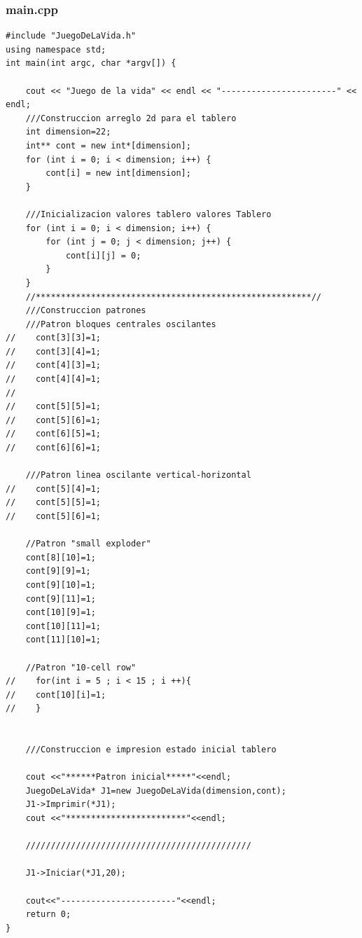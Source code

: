 \documentclass[12pt,letterpaper]{article}
\begin{document}
\subsubsection{main.cpp}
\lstset {language=C}
\begin{lstlisting}
#include "JuegoDeLaVida.h"
using namespace std;
int main(int argc, char *argv[]) {
    
    cout << "Juego de la vida" << endl << "-----------------------" << endl;
    ///Construccion arreglo 2d para el tablero
    int dimension=22;
    int** cont = new int*[dimension];
    for (int i = 0; i < dimension; i++) {
        cont[i] = new int[dimension];
    }
    
    ///Inicializacion valores tablero valores Tablero
    for (int i = 0; i < dimension; i++) {
        for (int j = 0; j < dimension; j++) {
            cont[i][j] = 0;
        }
    }
    //*******************************************************//
    ///Construccion patrones
    ///Patron bloques centrales oscilantes
//    cont[3][3]=1;
//    cont[3][4]=1;
//    cont[4][3]=1;
//    cont[4][4]=1;
//    
//    cont[5][5]=1;
//    cont[5][6]=1;
//    cont[6][5]=1;
//    cont[6][6]=1;
    
    ///Patron linea oscilante vertical-horizontal
//    cont[5][4]=1;
//    cont[5][5]=1;
//    cont[5][6]=1;
    
    //Patron "small exploder"
    cont[8][10]=1;
    cont[9][9]=1;
    cont[9][10]=1;
    cont[9][11]=1;
    cont[10][9]=1;
    cont[10][11]=1;
    cont[11][10]=1;
    
    //Patron "10-cell row"
//    for(int i = 5 ; i < 15 ; i ++){
//    cont[10][i]=1;
//    }
    
    
    ///Construccion e impresion estado inicial tablero
    
    cout <<"******Patron inicial*****"<<endl;
    JuegoDeLaVida* J1=new JuegoDeLaVida(dimension,cont);
    J1->Imprimir(*J1);
    cout <<"************************"<<endl;

    /////////////////////////////////////////////
    
    J1->Iniciar(*J1,20);
     
    cout<<"-----------------------"<<endl;
    return 0;
}

\end{lstlisting}
\end{document}
